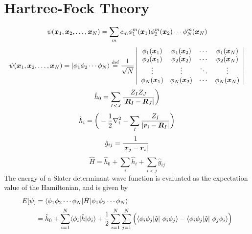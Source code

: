 \section{Hartree-Fock Theory}\label{sec:HFT}
\begin{equation}
    \psi(\boldsymbol x_1,\boldsymbol x_2,\dots,\boldsymbol x_N) = \sum_m c_m 
	\phi_1^m(\boldsymbol x_1)
	\phi_2^m(\boldsymbol x_2)\cdots
	\phi_N^m(\boldsymbol x_N)
\end{equation}
\begin{equation}
    \begin{split}
    \psi(\boldsymbol x_1,\boldsymbol x_2,\dots,\boldsymbol x_N) = 
    |\phi_1\phi_2\cdots\phi_N\rangle \stackrel{\text{def}}{\hbox{=}} \frac{1}{\sqrt{N}} 
    \left|
    \begin{array}{cccc}
	\phi_1(\boldsymbol x_1)	& \phi_1(\boldsymbol x_2)	& \cdots & \phi_1(\boldsymbol x_N)\\
	\phi_2(\boldsymbol x_1)	& \phi_2(\boldsymbol x_2)	& \cdots & \phi_2(\boldsymbol x_N)\\
	\vdots			& \vdots		& \ddots & \vdots\\
	\phi_N(\boldsymbol x_1)	& \phi_N(\boldsymbol x_2)	& \cdots & \phi_N(\boldsymbol x_N)
    \end{array}
    \right|
    \end{split}
\end{equation}
\begin{equation}
    \hat{h}_0 = \sum_{I<J} \frac{Z_IZ_J}{|\boldsymbol R_I-\boldsymbol R_J|}\bigg)
\end{equation}
\begin{equation}
    \hat{h}_i = \bigg(-\frac{1}{2}\nabla_i^2
	-\sum_I \frac{Z_I}{|\boldsymbol r_i-\boldsymbol R_I|}\bigg)
\end{equation}
\begin{equation}
    \hat{g}_{ij} = \frac{1}{|\boldsymbol r_j-\boldsymbol r_i|}
\end{equation}
\begin{equation}
    \hat{H} = \hat{h}_0 + \sum_i \hat{h}_i + \sum_{i<j} \hat{g}_{ij}
\end{equation}
The energy of a Slater determinant wave function is evaluated as the expectation value
of the Hamiltonian, and is given by
\begin{align}
    E[\wavefunction] &=
    \langle\orbital_1\orbital_2\cdots\orbital_N|\hat{H}|
    \orbital_1\orbital_2\cdots\orbital_N\rangle\\
    &= \hat{h}_0 + \sum_{i=1}^N \langle \orbital_i |\hat{h}| \orbital_i \rangle +
    \frac{1}{2} \sum_{i=1}^N\sum_{j=1}^N \Big(
    \langle \orbital_i\orbital_j |\hat{g}| \orbital_i\orbital_j\rangle -
    \langle \orbital_i\orbital_j |\hat{g}| \orbital_j\orbital_i\rangle\Big)
\end{align}
